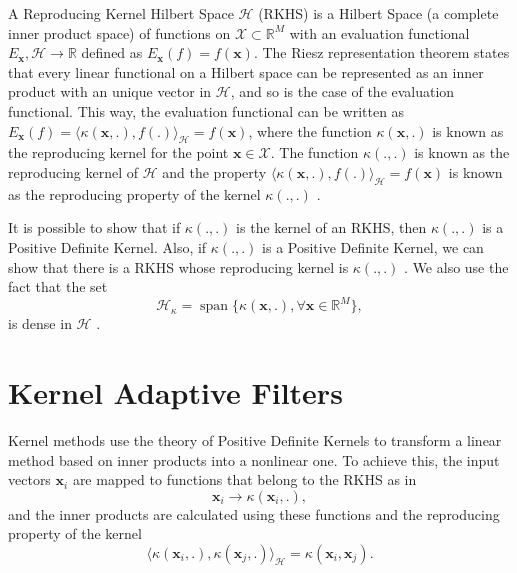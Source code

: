 A Reproducing Kernel Hilbert Space $\mathcal{H}$ (RKHS) is a Hilbert Space (a complete inner product space) of functions on $\mathcal{X} \subset \mathbb{R}^M$ with an 
evaluation functional $E_{\mathbf{x}},\mathcal{H} \rightarrow \mathbb{R}$ defined as $E_{\mathbf{x}}(f) = f(\mathbf{x})$. The Riesz representation theorem \cite{riesz_functional_2009} states that every 
linear functional on a Hilbert space can be represented as an inner product with an unique vector in $\mathcal{H}$, and so is the case of the evaluation functional. 
This way, the evaluation functional can be written as $E_{\mathbf{x}}(f) = \langle \kappa(\mathbf{x},.),f(.) \rangle_\mathcal{H} = f(\mathbf{x})$, where the function $\kappa(\mathbf{x},.)$ 
is known as the reproducing kernel for the point $\mathbf{x} \in \mathcal{X}$. The function $\kappa(.,.)$ is known as the reproducing kernel of $\mathcal{H}$ and the property
$\langle \kappa(\mathbf{x},.),f(.) \rangle_\mathcal{H} = f(\mathbf{x})$ is known as the reproducing property of the kernel $\kappa(.,.)$ \cite{paulsen_introduction_2016}. 

It is possible to show \cite{paulsen_introduction_2016} that if $\kappa(.,.)$ is the kernel of an RKHS, then $\kappa(.,.)$ is a Positive Definite Kernel. Also, if $\kappa(.,.)$ 
is a Positive Definite Kernel, we can show that there is a RKHS whose reproducing kernel is $\kappa(.,.)$ \cite{paulsen_introduction_2016}. We also use the fact that the 
set 
\begin{equation}
    \mathcal{H}_{\kappa} = \operatorname{span}\{\kappa(\mathbf{x},.), \forall \mathbf{x}\in \mathbb{R}^M\},
\end{equation}
is dense in $\mathcal{H}$ \cite{aronszajn_theory_1950}.

\section{Kernel Adaptive Filters}

Kernel methods \cite{scholkopf_learning_2002} use the theory of Positive Definite Kernels to transform a linear method based on inner products into a nonlinear one. 
To achieve this, the input vectors $\mathbf{x}_i$ are mapped to functions that belong to the RKHS as in
\begin{equation}
    \mathbf{x}_i \rightarrow \kappa(\mathbf{x}_i,.),
\end{equation}
and the inner products are calculated using these functions and the reproducing property of the kernel
\begin{equation}
    \langle \kappa(\mathbf{x}_i,.), \kappa(\mathbf{x}_j,.) \rangle_{\mathcal{H}} = \kappa(\mathbf{x}_i, \mathbf{x}_j).
\end{equation}

